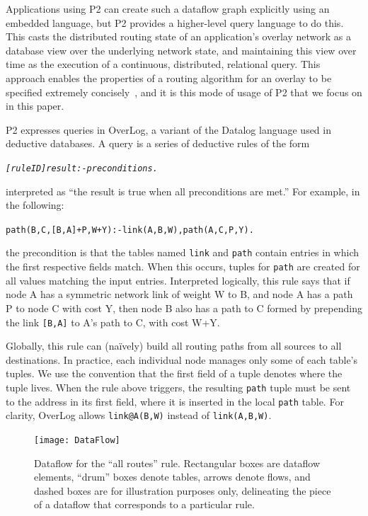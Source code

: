 \documentclass{sig-alt-full}
\def\Sys{P2\xspace}
\def\Lang{OverLog\xspace}
\newenvironment{overlog}{\begin{alltt}\footnotesize}{\end{alltt}}
\newcommand{\ol}[1]{{\tt\footnotesize#1}}
\begin{document}
Applications using \Sys can create such a dataflow graph explicitly
using an embedded language, but \Sys provides a higher-level query
language to do this.   This casts the distributed routing state of an
application's overlay network as a database view over the underlying
network state, and maintaining this view over time as the execution of
a continuous, distributed, relational query.  
This approach enables the properties of a
routing algorithm for an overlay to be specified extremely concisely~\cite{Loo2005SOSP},
and it is this mode of usage of \Sys that we focus on in this paper. 

\Sys expresses queries in \Lang, a variant of the
Datalog language used in deductive databases. A query is a series of deductive
rules of the form
\begin{overlog}
\textit{[ruleID] result :- preconditions.}
\end{overlog}
interpreted as
``the result is true when all preconditions are met.'' For example, in
the following: 
\begin{overlog}
path(B,C,[B,A]+P,W+Y) :- link(A,B,W), path(A,C,P,Y).
\end{overlog}
the precondition is that the tables named \ol{link} and \ol{path} contain
entries in which the first respective fields match.  When
this occurs, tuples for \ol{path} are created for all values matching
the input entries. Interpreted logically,
this rule says that if node A has a symmetric network link of weight W
to B, and node A has a path P to node C with cost Y, then node B also
has a path to C formed by prepending the link \ol{[B,A]} to A's path to
C, with cost W+Y.

Globally, this rule can (na\"ively) build
all routing paths 
from all sources to all destinations.  In practice, each individual node
manages only some of each table's tuples.  We 
use the convention that the first field of a tuple denotes where
the tuple lives. When the rule above triggers, the resulting \ol{path}
tuple must be sent to the address in its first field,
where it is inserted in the local \ol{path} table.  For clarity, \Lang
allows \ol{link@A(B,W)} instead of \ol{link(A,B,W)}.

\begin{figure}
\centerline{\texttt{[image: DataFlow]}}
\caption{Dataflow for the ``all routes'' rule.  Rectangular boxes are
  dataflow elements, ``drum'' boxes denote tables, arrows denote flows,
  and dashed boxes are for illustration purposes only, delineating the
  piece of a dataflow that corresponds to a particular rule.}
\label{fig:DataFlow}
\end{figure}
\end{document}

